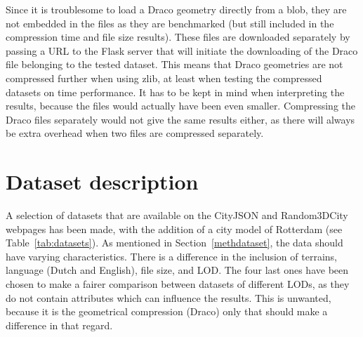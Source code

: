 Since it is troublesome to load a Draco geometry directly from a \ac{blob}, they are not embedded in the files as they are benchmarked (but still included in the compression time and file size results).
These files are downloaded separately by passing a URL to the Flask server that will initiate the downloading of the Draco file belonging to the tested dataset.
This means that Draco geometries are not compressed further when using zlib, at least when testing the compressed datasets on time performance.
It has to be kept in mind when interpreting the results, because the files would actually have been even smaller.
Compressing the Draco files separately would not give the same results either, as there will always be extra overhead when two files are compressed separately.



\section{Dataset description}
\label{datasetdescription}

A selection of datasets that are available on the CityJSON and Random3DCity webpages has been made, with the addition of a city model of Rotterdam (see Table~\ref{tab:datasets}).
As mentioned in Section~\ref{methdataset}, the data should have varying characteristics.
There is a difference in the inclusion of terrains, language (Dutch and English), file size, and LOD.
The four last ones have been chosen to make a fairer comparison between datasets of different LODs, as they do not contain attributes which can influence the results.
This is unwanted, because it is the geometrical compression (Draco) only that should make a difference in that regard.


